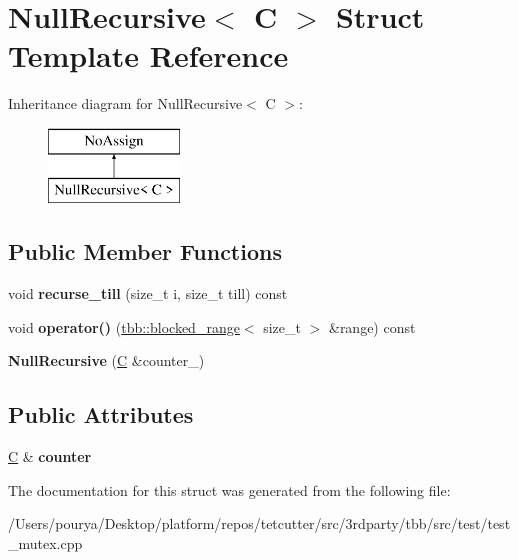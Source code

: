 \hypertarget{structNullRecursive}{}\section{Null\+Recursive$<$ C $>$ Struct Template Reference}
\label{structNullRecursive}
Inheritance diagram for Null\+Recursive$<$ C $>$\+:\begin{figure}[H]
\begin{center}
\leavevmode
\includegraphics[height=2.000000cm]{structNullRecursive}
\end{center}
\end{figure}
\subsection*{Public Member Functions}
\begin{DoxyCompactItemize}
\item 
\hypertarget{structNullRecursive_af48c6a5b87d52ff0fd200ff8c3d7728b}{}void {\bfseries recurse\+\_\+till} (size\+\_\+t i, size\+\_\+t till) const \label{structNullRecursive_af48c6a5b87d52ff0fd200ff8c3d7728b}

\item 
\hypertarget{structNullRecursive_a7f7f36852b7f08322cf169df91927173}{}void {\bfseries operator()} (\hyperlink{classtbb_1_1blocked__range}{tbb\+::blocked\+\_\+range}$<$ size\+\_\+t $>$ \&range) const \label{structNullRecursive_a7f7f36852b7f08322cf169df91927173}

\item 
\hypertarget{structNullRecursive_a1ec34ffb8859870d6c84953813964a4a}{}{\bfseries Null\+Recursive} (\hyperlink{classC}{C} \&counter\+\_\+)\label{structNullRecursive_a1ec34ffb8859870d6c84953813964a4a}

\end{DoxyCompactItemize}
\subsection*{Public Attributes}
\begin{DoxyCompactItemize}
\item 
\hypertarget{structNullRecursive_a5d1e956a112cb4742d6f8ad18626e9c1}{}\hyperlink{classC}{C} \& {\bfseries counter}\label{structNullRecursive_a5d1e956a112cb4742d6f8ad18626e9c1}

\end{DoxyCompactItemize}


The documentation for this struct was generated from the following file\+:\begin{DoxyCompactItemize}
\item 
/\+Users/pourya/\+Desktop/platform/repos/tetcutter/src/3rdparty/tbb/src/test/test\+\_\+mutex.\+cpp\end{DoxyCompactItemize}
